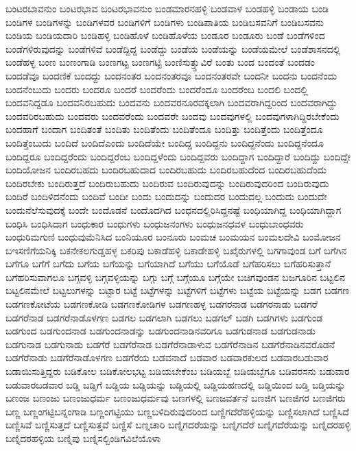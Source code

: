 {ಬಂಟರಬಾವನುಂ
ಬಂಟರಭಾವ
ಬಂಟರಭಾವನುಂ
ಬಂಡಮಾರನಹಳ್ಳಿ
ಬಂಡವಾಳ
ಬಂಡಹಳ್ಳಿ
ಬಂಡಾಯ
ಬಂಡಿ
ಬಂಡಿಗಳ
ಬಂಡಿಗಳನ್ನು
ಬಂಡಿಗಳವರ
ಬಂಡಿಗಳಿಗೆ
ಬಂಡಿಗಳು
ಬಂಡಿಪಾತಿಯ
ಬಂಡಿಬಸವನಿಗೆ
ಬಂಡಿಬಸವನು
ಬಂಡಿಯ
ಬಂಡಿಯದಾರಿ
ಬಂಡಿಹಳ್ಳಿ
ಬಂಡಿಹೊಳೆ
ಬಂಡಿಹೊಳೆಯ
ಬಂಡೂರ
ಬಂಡೂರು
ಬಂಡೆ
ಬಂಡೆಗಳಿಂದ
ಬಂಡೆಗಳಿರುವುದನ್ನು
ಬಂಡೆಗಳಿವೆ
ಬಂಡೆದ್ದಿದ್ದ
ಬಂಡೆದ್ದು
ಬಂಡೆಯ
ಬಂಡೆಯನ್ನು
ಬಂಡೆಯಮೇಲೆ
ಬಂಡೆಶಾಸನದಲ್ಲಿ
ಬಂಡೆಹಳ್ಳ
ಬಂಣ
ಬಂಣಂಗಾಡಿ
ಬಂಣಗಟ್ಟ
ಬಂಣಗಟ್ಟಿ
ಬಂಣಿಸುತ್ತ್ತುವಿರೆ
ಬಂತು
ಬಂದ
ಬಂದಂತೆ
ಬಂದಡಂ
ಬಂದಡೆವೂ
ಬಂದಣಿಕೆ
ಬಂದದ್ದು
ಬಂದನಂತರ
ಬಂದನಂತರವೂ
ಬಂದನಂತರವೇ
ಬಂದನೀ
ಬಂದನು
ಬಂದನೆಂದು
ಬಂದನೆಂಬುದು
ಬಂದರು
ಬಂದರೂ
ಬಂದರೆ
ಬಂದರೆಂದು
ಬಂದರೆಂದೂ
ಬಂದರೆಂಬ
ಬಂದಲಿ
ಬಂದಲ್ಲಿ
ಬಂದವನಿದ್ದಡೂ
ಬಂದವನಿರಬಹುದು
ಬಂದವನು
ಬಂದವರನೂರವಕ್ಕಲಾಗಿ
ಬಂದವರಾಗಿದ್ದರಿಂದ
ಬಂದವರಾಗಿದ್ದು
ಬಂದವರಿರಬಹುದು
ಬಂದವರು
ಬಂದವರೆಂದು
ಬಂದವರೇ
ಬಂದವು
ಬಂದವುಗಳಲ್ಲಿ
ಬಂದವುಗಳಾಗಿದ್ದಿರಬೇಕೆಂದು
ಬಂದಹಾಗೆ
ಬಂದಾಗ
ಬಂದಿತಂತೆ
ಬಂದಿತು
ಬಂದಿತೆಂದು
ಬಂದಿತೆಂದೂ
ಬಂದಿತ್ತು
ಬಂದಿತ್ತೆಂದು
ಬಂದಿತ್ತೆಂದೂ
ಬಂದಿತ್ತೆಂಬುದು
ಬಂದಿದೆ
ಬಂದಿದೆಎಂದು
ಬಂದಿದೆಯೇ
ಬಂದಿದ್ದ
ಬಂದಿದ್ದನು
ಬಂದಿದ್ದನೆಂದು
ಬಂದಿದ್ದನೆಂದೂ
ಬಂದಿದ್ದರೂ
ಬಂದಿದ್ದರೆಂದು
ಬಂದಿದ್ದರೆಂಬ
ಬಂದಿದ್ದಳೆಂದು
ಬಂದಿದ್ದವರು
ಬಂದಿದ್ದಾಗ
ಬಂದಿದ್ದಾರೆ
ಬಂದಿದ್ದು
ಬಂದಿದ್ದೇ
ಬಂದಿಯೋಜನ
ಬಂದಿರಬಹದು
ಬಂದಿರಬಹುದಾದ
ಬಂದಿರಬಹುದು
ಬಂದಿರಬಹುದೆಂದ
ಬಂದಿರಬಹುದೆಂದು
ಬಂದಿರಬೇಕು
ಬಂದಿರುತ್ತದೆ
ಬಂದಿರುಬಹುದು
ಬಂದಿರುವ
ಬಂದಿರುವುದನ್ನು
ಬಂದಿರುವುದರಿಂದ
ಬಂದಿರುವುದು
ಬಂದಿರೆ
ಬಂದಿಳಿದನೆಂದು
ಬಂದಿವೆ
ಬಂದೀ
ಬಂದು
ಬಂದುದನ್ನು
ಬಂದುದರ
ಬಂದುದಲ್ಲ
ಬಂದುದು
ಬಂದುದೇ
ಬಂದುನೆಲೆಸುವುದಕ್ಕೆ
ಬಂದೇ
ಬಂದೊಡನೆ
ಬಂದೊದಗಿದ
ಬಂಧನದಲ್ಲಿರಿಸಿದ್ದನಷ್ಟೆ
ಬಂಧಿಯಾಗಿದ್ದ
ಬಂಧಿಯಾಗಿದ್ದಾಗ
ಬಂಧಿಸಿ
ಬಂಧಿಸಿದಾಗ
ಬಂಧುಕಾರ
ಬಂಧುಗಳು
ಬಂಧುಜನಂಗಳು
ಬಂಧುಜನಧವಳ
ಬಂಧುಬಾಂಧವರು
ಬಂಧುರಿಮಗುಣಿ
ಬಂಧುವುಮೆನಿಸಿದ
ಬಂನಿಯೂರ
ಬಂನೂರು
ಬಂಮಚ
ಬಂಮಯನ
ಬಂಮಲದೇವಿ
ಬಂಮೋಜನ
ಬಇಸಣಿಗೆಯನಿಕ್ಕಿ
ಬಕನೇಕಲಗುಡ್ಡಹಳ್ಳ
ಬಕರಿಪು
ಬಕಾಡೆಹಳ್ಳಿ
ಬಕಾಡೇಹಳ್ಳಿ
ಬಖೈರುಗಳಲ್ಲಿ
ಬಗಗಾವುಂಡ
ಬಗೆ
ಬಗೆಗಿನ
ಬಗೆಗೂ
ಬಗೆಗೆ
ಬಗೆದು
ಬಗೆಯ
ಬಗೆಯನ್ನು
ಬಗೆಯಾಗಿದೆ
ಬಗೆಯು
ಬಗೆಯೊಡೆ
ಬಗೆಹರಿಸಲು
ಬಗೆಹರಿಸುತ್ತಾನೆ
ಬಗೆಹರಿಸುವಾಗಲೂ
ಬಗ್ಗವಳ್ಳಿ
ಬಗ್ಗವಳ್ಳಿಯನ್ನು
ಬಗ್ಗು
ಬಗ್ಗೆ
ಬಗ್ಗೆಯೂ
ಬಗ್ಗೆಯೇ
ಬಚಿಗವುಂಡನ
ಬಜಗೂರಿನ
ಬಟ್ಟಲಿನ
ಬಟ್ಟಲಿನಮೇಲೆ
ಬಟ್ಟಲುಗಳನ್ನು
ಬಟ್ಟಾರ
ಬಟ್ಟೆ
ಬಟ್ಟೆಗಳನ್ನು
ಬಟ್ಟೆಗಳಿಗೆ
ಬಟ್ಟೆಗಳು
ಬಟ್ಟೆಯ
ಬಟ್ಟೆಯನ್ನು
ಬಡಗ
ಬಡಗಣ
ಬಡಗಣಕೋಟೆಯ
ಬಡಗಣಕೋಡಿ
ಬಡಗಣಕೋಡಿಗಳ
ಬಡಗಣಹಳ್ಳ
ಬಡಗರನಾಡ
ಬಡಗರನಾಡು
ಬಡಗರೆ
ಬಡಗರೆನಾಡ
ಬಡಗರೆನಾಡೊಳಗಣ
ಬಡಗಲ
ಬಡಗಲಾಗಿ
ಬಡಗಲು
ಬಡಗಲ್
ಬಡಗಿ
ಬಡಗಿಗಳು
ಬಡಗುಂಡ
ಬಡಗುಂದ
ಬಡಗುಂದನಾಡ
ಬಡಗುಂದನಾಡನ್ನು
ಬಡಗುಂದನಾಡಿನವರಿಗೂ
ಬಡಗುಡನಾಡ
ಬಡಗುಡನಾಡು
ಬಡಗುನಾಡ
ಬಡಗುನಾಡು
ಬಡಗೆರೆ
ಬಡಗೆರೆನಾಡ
ಬಡಗೆರೆನಾಡಾಳುವ
ಬಡಗೆರೆನಾಡಿನ
ಬಡಗೆರೆನಾಡಿನವರೊಡನೆ
ಬಡಗೆರೆನಾಡು
ಬಡಗೆರೆನಾಡೊಳಗಣ
ಬಡಗೆರೆಯ
ಬಡವನಾದೆ
ಬಡವಾರ
ಬಡವಾರಕುಲದ
ಬಡವಾರಬಡುವಾರ
ಬಡಾಯಿಸುತ್ತಿದ್ದರು
ಬಡಿಕೋಲ
ಬಡಿಕೋಲಭಟ್ಟ
ಬಡಿಯಬೇಕೆಂಬ
ಬಡಿಯಬ್ಬೆ
ಬಡಿಯಬ್ಬೆಗೂ
ಬಡಿವರಸನು
ಬಡುವಾರ
ಬಡುವಾರಬಡವಾರ
ಬಡ್ಡಿ
ಬಡ್ಡಿಗೆ
ಬಡ್ಡಿಯ
ಬಡ್ಡಿಯನ್ನು
ಬಡ್ಡಿಯಲ್ಲಿ
ಬಡ್ಡಿಯಹಣದಲ್ಲಿ
ಬಡ್ಡಿಯಿಂದ
ಬಡ್ತಿ
ಬಡ್ತಿಯನ್ನು
ಬಣಂಜ
ಬಣಂಜು
ಬಣಂಜುಧರ್ಮ
ಬಣಂಜುಧರ್ಮವು
ಬಣಗಳಲ್ಲಿ
ಬಣಜವರ್ತನೆ
ಬಣಜಿಗ
ಬಣಜಿಗರ
ಬಣಜಿಗರು
ಬಣ್ಣ
ಬಣ್ಣಂಗಟ್ಟಿಬನ್ನಂಗಾಡಿ
ಬಣ್ಣಂಗಟ್ಟಿಯು
ಬಣ್ಣಬಳಿದಿರುವುದರಿಂದ
ಬಣ್ಣಿಗದೆರೆಹಳ್ಳಿಯನ್ನು
ಬಣ್ಣಿಸಲಾಗಿದೆ
ಬಣ್ಣಿಸಿದೆ
ಬಣ್ಣಿಸಿವೆ
ಬಣ್ಣಿಸುತ್ತದೆ
ಬಣ್ಣಿಸುತ್ತವೆ
ಬಣ್ಣಿಸೆ
ಬಣ್ನಚಾರಿ
ಬಣ್ನಿಗದರೆಯನ್ನು
ಬಣ್ನಿಗದೆರೆ
ಬಣ್ನಿಗದೆರೆಯನ್ನು
ಬಣ್ನಿದರಹಳ್ಳಿ
ಬಣ್ನಿದರಹಳ್ಳಿಯ
ಬಣ್ನಿಪು
ಬಣ್ನಿಸಲ್ಬಿಂಡಿಗವಿಲೆಯೊಳಾ
}
